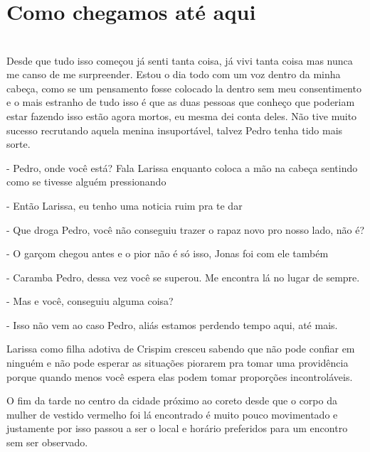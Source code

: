 
    


\newpage


\ifdefined\useChapters
\chapter{Como chegamos até aqui}

\else
\chapter{}
\fi

Desde que tudo isso começou já senti tanta coisa, já vivi tanta coisa mas nunca me canso de me surpreender. Estou o dia todo com um voz dentro da minha cabeça, como se um pensamento fosse colocado la dentro sem meu consentimento e o mais estranho de tudo isso é que as duas pessoas que conheço que poderiam estar fazendo isso estão agora mortos, eu mesma dei conta deles. Não tive muito sucesso recrutando aquela menina insuportável, talvez Pedro tenha tido mais sorte.

- Pedro, onde você está? Fala Larissa enquanto coloca a mão na cabeça sentindo como se tivesse alguém pressionando

- Então Larissa, eu tenho uma noticia ruim pra te dar

- Que droga Pedro, você não conseguiu trazer o rapaz novo pro nosso lado, não é?

- O garçom chegou antes e o pior não é só isso, Jonas foi com ele também

- Caramba Pedro, dessa vez você se superou. Me encontra lá no lugar de sempre.

- Mas e você, conseguiu alguma coisa?

- Isso não vem ao caso Pedro, aliás estamos perdendo tempo aqui, até mais.

Larissa como filha adotiva de Crispim cresceu sabendo que não pode confiar em ninguém e não pode esperar as situações piorarem pra tomar uma providência porque quando menos você espera elas podem tomar proporções incontroláveis.

O fim da tarde no centro da cidade próximo ao coreto desde que o corpo da mulher de vestido vermelho foi lá encontrado é muito pouco movimentado e justamente por isso passou a ser o local e horário preferidos para um encontro sem ser observado.

